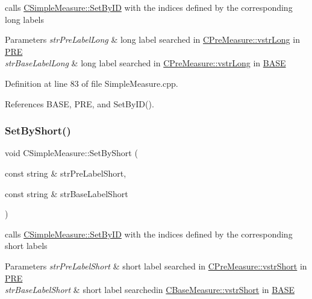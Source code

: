 calls \hyperlink{classCSimpleMeasure_a6945aa333dca5623482d38cd9a7e3225}{C\+Simple\+Measure\+::\+Set\+By\+ID} with the indices defined by the corresponding long labels 


\begin{DoxyParams}{Parameters}
{\em str\+Pre\+Label\+Long} & long label searched in \hyperlink{classCVectorHandle_a71bec0e385b9ca8e5ffa174b559da9f8}{C\+Pre\+Measure\+::vstr\+Long} in \hyperlink{PreMeasure_8h_a349316092037fdd0773335fab4e15ee8}{P\+RE} \\
\hline
{\em str\+Base\+Label\+Long} & long label searched in \hyperlink{classCVectorHandle_a71bec0e385b9ca8e5ffa174b559da9f8}{C\+Pre\+Measure\+::vstr\+Long} in \hyperlink{BaseMeasure_8h_a79bcfb6bde984f42d1124b068a509af7}{B\+A\+SE} \\
\hline
\end{DoxyParams}


Definition at line 83 of file Simple\+Measure.\+cpp.



References B\+A\+SE, P\+RE, and Set\+By\+I\+D().

\mbox{\label{classCSimpleMeasure_a36d8822c057c58669d23af68f24a75c5}} 
\subsubsection{\texorpdfstring{Set\+By\+Short()}{SetByShort()}}
{\footnotesize\ttfamily void C\+Simple\+Measure\+::\+Set\+By\+Short (\begin{DoxyParamCaption}\item[{const string \&}]{str\+Pre\+Label\+Short,  }\item[{const string \&}]{str\+Base\+Label\+Short }\end{DoxyParamCaption})}



calls \hyperlink{classCSimpleMeasure_a6945aa333dca5623482d38cd9a7e3225}{C\+Simple\+Measure\+::\+Set\+By\+ID} with the indices defined by the corresponding short labels 


\begin{DoxyParams}{Parameters}
{\em str\+Pre\+Label\+Short} & short label searched in \hyperlink{classCVectorHandle_afb50c8a33d4cf70bf92c644dca409ea2}{C\+Pre\+Measure\+::vstr\+Short} in \hyperlink{PreMeasure_8h_a349316092037fdd0773335fab4e15ee8}{P\+RE} \\
\hline
{\em str\+Base\+Label\+Short} & short label searchedin \hyperlink{classCVectorHandle_afb50c8a33d4cf70bf92c644dca409ea2}{C\+Base\+Measure\+::vstr\+Short} in \hyperlink{BaseMeasure_8h_a79bcfb6bde984f42d1124b068a509af7}{B\+A\+SE} \\
\hline
\end{DoxyParams}


